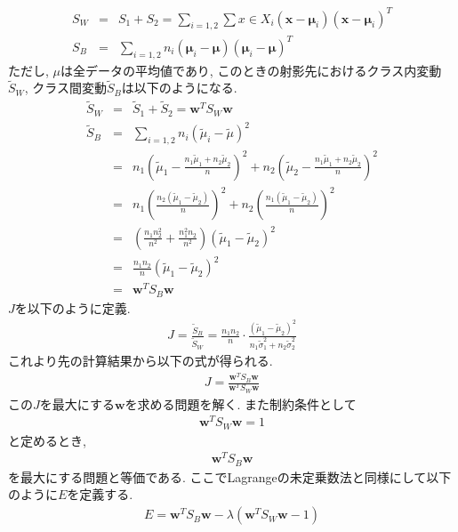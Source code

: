 \begin{eqnarray*}
    S_{W}&=&S_{1}+S_{2}=\sum_{i=1,2}\sum{x\in X_{i}}(\bm{x}-\bm{\mu}_{i})(\bm{x}-\bm{\mu}_{i})^{T}\\
    S_{B}&=&\sum_{i=1,2}n_{i}(\bm{\mu}_{i}-\bm{\mu})(\bm{\mu}_{i}-\bm{\mu})^{T}
\end{eqnarray*}
ただし, $\mu$は全データの平均値であり, このときの射影先におけるクラス内変動$\tilde{S}_{W}$, クラス間変動$\tilde{S}_{B}$は以下のようになる.
\begin{eqnarray*}
    \tilde{S}_{W}&=&\tilde{S}_{1}+\tilde{S}_{2}=\bm{w}^{T}S_{W}\bm{w}\\
    \tilde{S}_{B}&=&\sum_{i=1,2}n_{i}(\tilde{\mu}_{i}-\tilde{\mu})^{2}\\
                 &=&n_{1}\left(\tilde{\mu}_{1}-\frac{n_{1}\tilde{\mu}_{1}+n_{2}\tilde{\mu}_{2}}{n}\right)^{2}+n_{2}\left(\tilde{\mu}_{2}-\frac{n_{1}\tilde{\mu}_{1}+n_{2}\tilde{\mu}_{2}}{n}\right)^{2}\\
                 &=&n_{1}\left(\frac{n_{2}(\tilde{\mu}_{1}-\tilde{\mu}_{2})}{n}\right)^{2}+n_{2}\left(\frac{n_{1}(\tilde{\mu}_{1}-\tilde{\mu}_{2})}{n}\right)^{2}\\
                 &=&\left(\frac{n_{1}n_{2}^{2}}{n^{2}}+\frac{n_{1}^{2}n_{2}}{n^{2}}\right)(\tilde{\mu}_{1}-\tilde{\mu}_{2})^{2}\\
                 &=&\frac{n_{1}n_{2}}{n}(\tilde{\mu}_{1}-\tilde{\mu}_{2})^{2}\\
                 &=&\bm{w}^{T}S_{B}\bm{w}
\end{eqnarray*}
$J$を以下のように定義.
\begin{align*}
    J=\frac{\tilde{S}_{B}}{\tilde{S}_{W}}=\frac{n_{1}n_{2}}{n}\cdot \frac{(\tilde{\mu}_{1}-\tilde{\mu}_{2})^{2}}{n_{1}\tilde{\sigma}_{1}^{2}+n_{2}\tilde{\sigma}_{2}^{2}} \tag{6.5}
\end{align*}
これより先の計算結果から以下の式が得られる.
\begin{eqnarray*}
    J=\frac{\bm{w}^{T}S_{B}\bm{w}}{\bm{w}^{T}S_{W}\bm{w}}
\end{eqnarray*}
この$J$を最大にする$\bm{w}$を求める問題を解く. また制約条件として
\begin{eqnarray*}
    \bm{w}^{T}S_{W}\bm{w}=1
\end{eqnarray*}
と定めるとき,
\begin{eqnarray*}
    \bm{w}^{T}S_{B}\bm{w}
\end{eqnarray*}
を最大にする問題と等価である.
ここでLagrangeの未定乗数法と同様にして以下のように$E$を定義する.
\begin{eqnarray*}
    E=\bm{w}^{T}S_{B}\bm{w}-\lambda(\bm{w}^{T}S_{W}\bm{w}-1)
\end{eqnarray*}
